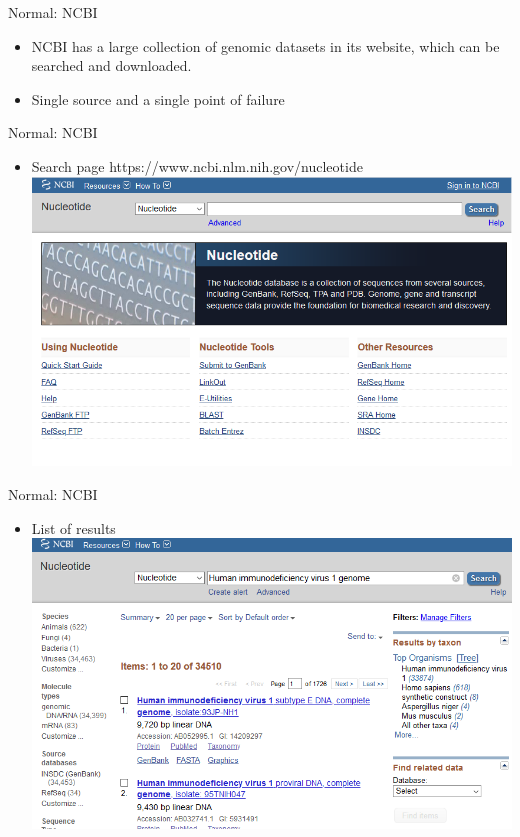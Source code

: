 \documentclass{beamer}
\begin{document}
  \begin{frame}{Normal: NCBI}
        \begin{itemize}
            \item NCBI has a large collection of genomic datasets in its website, which can be searched and downloaded.
            \item Single source and a single point of failure
        \end{itemize}
    \end{frame}
    \begin{frame}{Normal: NCBI}
        \begin{itemize}
            \item Search page https://www.ncbi.nlm.nih.gov/nucleotide
            \includegraphics[scale=0.5]{ncbi1.png}
        \end{itemize}
    \end{frame}
    \begin{frame}{Normal: NCBI}
        \begin{itemize}
            \item List of results
            \includegraphics[scale=0.5]{ncbi2.png}
        \end{itemize}
    \end{frame}
\end{document}
